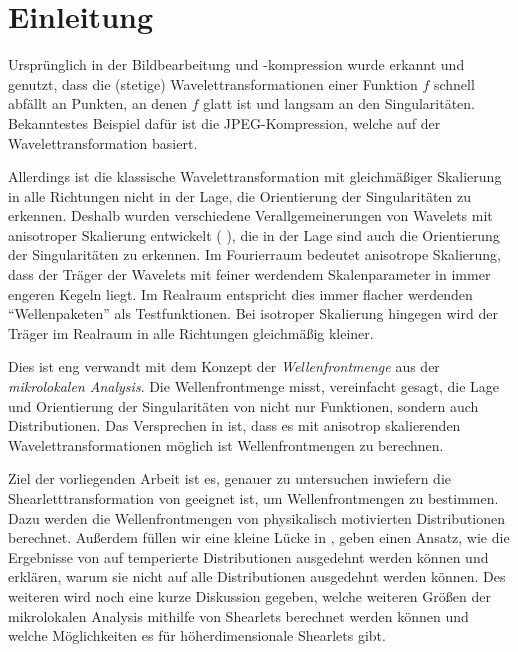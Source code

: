 \chapter{Einleitung} %
\label{sec:einleitung_mathematik}

Ursprünglich in der Bildbearbeitung und -kompression wurde erkannt und genutzt, dass die (stetige) Wavelettransformationen einer Funktion $f$ schnell abfällt an Punkten, an denen $f$ glatt ist und langsam an den Singularitäten. Bekanntestes Beispiel dafür ist die JPEG-Kompression, welche auf der Wavelettransformation basiert.

Allerdings ist die klassische Wavelettransformation mit gleichmäßiger Skalierung in alle Richtungen nicht in der Lage, die Orientierung der Singularitäten zu erkennen. Deshalb wurden verschiedene Verallgemeinerungen von Wavelets mit anisotroper Skalierung entwickelt (\cite{Guo2006} \cite{Kutyniok2008} \cite{Candes2005}), die in der Lage sind auch die Orientierung der Singularitäten zu erkennen. Im Fourierraum bedeutet anisotrope Skalierung, dass der Träger der Wavelets mit feiner werdendem Skalenparameter in immer engeren Kegeln liegt. Im Realraum entspricht dies immer flacher werdenden "`Wellenpaketen"' als Testfunktionen. Bei isotroper Skalierung hingegen wird der Träger im Realraum in alle Richtungen gleichmäßig kleiner.

Dies ist eng verwandt mit dem Konzept der \emph{Wellenfrontmenge} aus der \emph{mikrolokalen Analysis}. Die Wellenfrontmenge misst, vereinfacht gesagt, die Lage und Orientierung der Singularitäten von nicht nur Funktionen, sondern auch Distributionen. Das Versprechen in \cite{Kutyniok2008} ist, dass es mit anisotrop skalierenden Wavelettransformationen möglich ist Wellenfrontmengen zu berechnen.

Ziel der vorliegenden Arbeit ist es, genauer zu untersuchen inwiefern die Shearletttransformation von \textcite{Kutyniok2008} geeignet ist, um Wellenfrontmengen zu bestimmen. Dazu werden die Wellenfrontmengen von physikalisch motivierten Distributionen berechnet. Außerdem füllen wir eine kleine Lücke in \cite{Kutyniok2008}, geben einen Ansatz, wie die Ergebnisse von \textcite{Kutyniok2008} auf temperierte Distributionen ausgedehnt werden können und erklären, warum sie nicht auf alle Distributionen ausgedehnt werden können.
Des weiteren wird noch eine kurze Diskussion gegeben, welche weiteren Größen der mikrolokalen Analysis mithilfe von Shearlets berechnet werden können und welche Möglichkeiten es für höherdimensionale Shearlets gibt.


